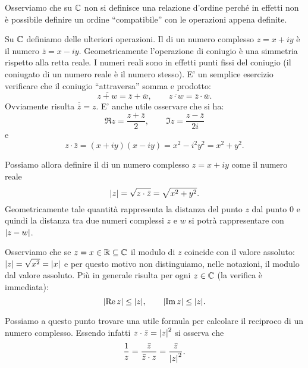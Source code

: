 Osserviamo che su ${\mathbb C}$ non si definisce una relazione d'ordine perché
in effetti non è possibile definire un ordine ``compatibile'' con le operazioni
appena definite.%

Su ${\mathbb C}$ definiamo delle ulteriori operazioni.
Il 
di un numero complesso $z=x+iy$ è il numero
$\bar z = x - iy$. Geometricamente l'operazione di coniugio è una simmetria
rispetto alla retta reale. I numeri reali sono in effetti punti fissi del
coniugio (il coniugato di un numero reale è il numero stesso).
E' un semplice esercizio verificare che il coniugio ``attraversa''
somma e prodotto:
\[
\overline{z+w} = \bar z + \bar w, \qquad
\overline{z\cdot w} = \bar z \cdot \bar w.
\]
Ovviamente risulta $\overline {\bar z} = z$.
E' anche utile osservare che si ha:
\begin{equation}\label{eq:re_im}
  \Re z = \frac{z+\bar z}{2}, \qquad
  \Im z = \frac{z-\bar z}{2i}
\end{equation}
e
\[
z \cdot \bar z = (x+iy)(x-iy) = x^2-i^2y^2 = x^2+y^2.
\]

Possiamo allora definire il
 di un numero complesso $z=x+iy$
come il numero reale
\[
{\left|z\right|} = \sqrt{z\cdot\bar z} = \sqrt{x^2+y^2}.
\]
Geometricamente tale quantità rappresenta la distanza del punto $z$
dal punto $0$ e quindi la distanza tra due numeri complessi $z$ e
$w$ si potrà rappresentare con ${\left|z-w\right|}$.

Osserviamo che se $z = x \in {\mathbb R} \subseteq {\mathbb C}$ il modulo di $z$ coincide
con il valore assoluto: ${\left|z\right|} = \sqrt{x^2} = {\left|x\right|}$ e per questo
motivo non distinguiamo, nelle notazioni, il modulo dal valore assoluto.
Più in generale risulta per ogni $z\in {\mathbb C}$ (la verifica è immediata):
\[
  {\left|\operatorname{Re} z\right|} \le {\left|z\right|}, \qquad
  {\left|\operatorname{Im}z\right|} \le {\left|z\right|}.
\]

Possiamo a questo punto trovare una utile formula per calcolare
il reciproco di un numero complesso. Essendo infatti
$z\cdot \bar z = {\left|z\right|}^2$ si osserva che
\[
  \frac{1}{z}
  = \frac{\bar z}{ \bar z \cdot z}
  = \frac{\bar z}{{\left|z\right|}^2}.
\]


